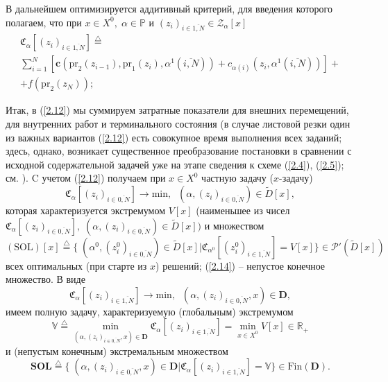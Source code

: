 \documentclass[10pt]{SPIIRAS_Proceedings}
\begin{document}
В дальнейшем оптимизируется аддитивный критерий,
для введения которого полагаем,
что при
$x \in X^0,\;\alpha \in \mathbb{P}$ и
$(z_i)_{i \in \overline{1,N}} \in \mathcal{Z}_\alpha[x]$
\begin{multline}\label{2.12}
\mathfrak{C}_{\alpha}[(z_i)_{i \in \overline{1,N}}] \stackrel{\triangle}{=}
\\
\sum\limits_{i=1}^N [\mathbf{c}(\mathrm{pr}_2(z_{i-1}),\mathrm{pr}_1(z_i),\alpha^1(\overline{i,N})) +
c_{\alpha(i)}(z_i,\alpha^1(\overline{i,N}))] +
\\
+ f(\mathrm{pr}_2(z_N));
\end{multline}

Итак, в (\ref{2.12})
мы суммируем затратные показатели для внешних перемещений,
для внутренних работ и терминального состояния
(в случае листовой резки один из важных вариантов (\ref{2.12})
есть совокупное время выполнения всех заданий;
здесь, однако,
возникает существенное преобразование постановки
в сравнении с исходной содержательной задачей
уже на этапе сведения к схеме
(\ref{2.4}), (\ref{2.5}); см. \cite[$\S$3.3]{4}).
C учетом (\ref{2.12}) получаем при
$x \in X^0$ частную задачу ($x$-задачу)
\begin{equation}\label{2.13}
  \mathfrak{C}_{\alpha}[(z_i)_{i \in \overline{0,N}}] \longrightarrow
  \mathrm{min},\;\;(\alpha,(z_i)_{i \in \overline{0,N}}) \in \tilde{D}[x],
\end{equation}
которая характеризуется экстремумом $V[x]$
(наименьшее из чисел
$\mathfrak{C}_{\alpha}[(z_i)_{i \in \overline{0,N}}],\;(\alpha,(z_i)_{i \in \overline{0,N}}) \in \tilde{D}[x])$
и множеством
\begin{equation}\label{2.14}
  (\mathrm{SOL})[x] \stackrel{\triangle}{=}
  \{\;(\alpha^0,(z_i^0)_{i \in \overline{0,N}}) \in \tilde{D}[x] \vert
  \mathfrak{C}_{\alpha^0}[(z_i^0)_{i \in \overline{1,N}}] = V[x]\} \in \mathcal{P}'(\tilde{D}[x])
\end{equation}
всех оптимальных
(при старте из $x$)
решений; (\ref{2.14}) -- непустое конечное множество.
В виде
\begin{equation}\label{2.15}
  \mathfrak{C}_{\alpha}[(z_i)_{i \in \overline{1,N}}] \longrightarrow
  \mathrm{min},\;\;(\alpha,(z_i)_{i \in \overline{0,N}},x) \in \mathbf{D},
\end{equation}
имеем полную задачу, характеризуемую (глобальным) экстремумом
\begin{equation}\label{2.16}
  \mathbb{V} \stackrel{\triangle}{=}
  \min\limits_{(\alpha,(z_i)_{i \in \overline{0,N}},x) \in
  \mathbf{D}}\mathfrak{C}_{\alpha}[(z_i)_{i \in \overline{1,N}}]
  = \min\limits_{x \in X^0} V[x] \in \mathbb{R}_+
\end{equation}
и (непустым конечным) экстремальным множеством
\begin{equation}\label{2.17}
  \mathbf{SOL} \stackrel{\triangle}{=}
  \{\;(\alpha,(z_i)_{i \in \overline{0,N}},x) \in \mathbf{D}
  \vert \mathfrak{C}_{\alpha}[(z_i)_{i \in \overline{1,N}}] =
  \mathbb{V}\} \in \mathrm{Fin}(\mathbf{D}).
\end{equation}
\end{document}
